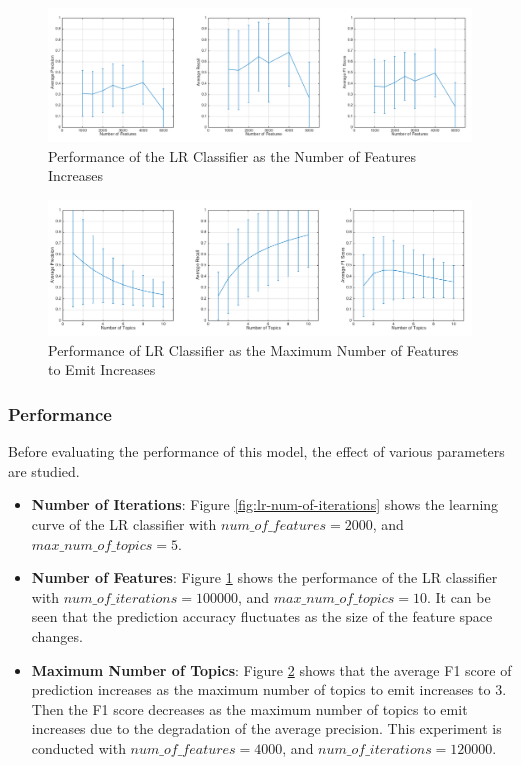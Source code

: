 \documentclass[11pt]{article}
\begin{document}
\begin{figure}
\centering
    \centering
    \includegraphics[width=1\textwidth]{lr-num-of-features.png}
    \caption{Performance of the LR Classifier as the Number of Features Increases}
    \label{fig:lr-num-of-features}
\end{figure}

\begin{figure}
\centering
    \centering
    \includegraphics[width=1\textwidth]{lr-num-of-topics.png}
    \caption{Performance of LR Classifier as the Maximum Number of Features to Emit Increases}
    \label{fig:lr-num-of-topics}
\end{figure}

\subsubsection*{Performance}
Before evaluating the performance of this model, the effect of various parameters are studied.

\begin{itemize}
    \item{\textbf{Number of Iterations}: 
    Figure \ref{fig:lr-num-of-iterations} shows the learning curve of the LR classifier with \newline $num\_of\_features=2000$, and $max\_num\_of\_topics = 5$.
    }
    \item{\textbf{Number of Features}: 
    Figure \ref{fig:lr-num-of-features} shows the performance of the LR classifier with \newline$num\_of\_iterations=100000$, and $max\_num\_of\_topics = 10$.
    It can be seen that the prediction accuracy fluctuates as the size of the feature space changes.
    }
    \item{\textbf{Maximum Number of Topics}: 
    Figure \ref{fig:lr-num-of-topics} shows that the average F1 score of prediction increases as the maximum number of topics to emit increases to $3$.
    Then the F1 score decreases as the maximum number of topics to emit increases due to the degradation of the average precision.
    This experiment is conducted with $num\_of\_features=4000$, and $num\_of\_iterations = 120000$.
    }
\end{itemize}
\end{document}
